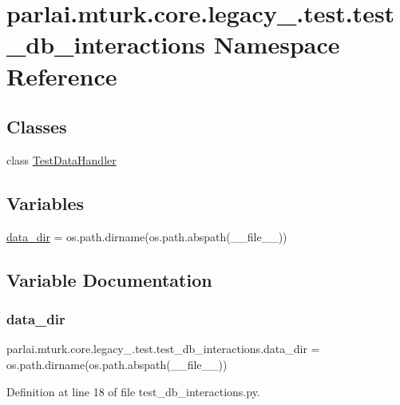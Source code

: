 \hypertarget{namespaceparlai_1_1mturk_1_1core_1_1legacy__2018_1_1test_1_1test__db__interactions}{}\section{parlai.\+mturk.\+core.\+legacy\+\_.\+test.\+test\+\_\+db\+\_\+interactions Namespace Reference}
\label{namespaceparlai_1_1mturk_1_1core_1_1legacy__2018_1_1test_1_1test__db__interactions}
\subsection*{Classes}
\begin{DoxyCompactItemize}
\item 
class \hyperlink{classparlai_1_1mturk_1_1core_1_1legacy__2018_1_1test_1_1test__db__interactions_1_1TestDataHandler}{Test\+Data\+Handler}
\end{DoxyCompactItemize}
\subsection*{Variables}
\begin{DoxyCompactItemize}
\item 
\hyperlink{namespaceparlai_1_1mturk_1_1core_1_1legacy__2018_1_1test_1_1test__db__interactions_ab430e4ea1590be5c12b661c8cdd83f9a}{data\+\_\+dir} = os.\+path.\+dirname(os.\+path.\+abspath(\+\_\+\+\_\+file\+\_\+\+\_\+))
\end{DoxyCompactItemize}


\subsection{Variable Documentation}
\mbox{\label{namespaceparlai_1_1mturk_1_1core_1_1legacy__2018_1_1test_1_1test__db__interactions_ab430e4ea1590be5c12b661c8cdd83f9a}} 
\subsubsection{\texorpdfstring{data\+\_\+dir}{data\_dir}}
{\footnotesize\ttfamily parlai.\+mturk.\+core.\+legacy\+\_.\+test.\+test\+\_\+db\+\_\+interactions.\+data\+\_\+dir = os.\+path.\+dirname(os.\+path.\+abspath(\+\_\+\+\_\+file\+\_\+\+\_\+))}



Definition at line 18 of file test\+\_\+db\+\_\+interactions.\+py.

